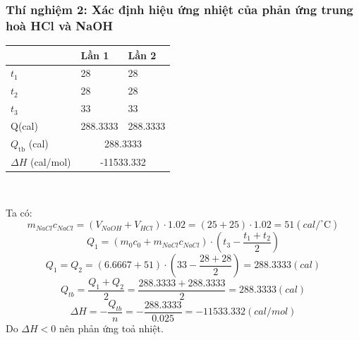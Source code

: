 \documentclass[12pt]{article}
\begin{document}
\subsubsection{Thí nghiệm 2: Xác định hiệu ứng nhiệt của phản ứng trung hoà HCl và NaOH}
{\centering \begin{tabular}{|m{3cm}|m{3cm}|m{3cm}|}
\hline
  & Lần 1 & Lần 2 \\ \hline
$t_1$ & 28 & 28 \\ \hline
$t_2$& 28 & 28 \\ \hline
$t_3$ & 33 & 33\\ \hline
Q(cal) &288.3333 & 288.3333\\ \hline
\(Q_{\text{tb}}\) (cal) & \multicolumn{2}{c|}{288.3333} \\ \hline
$\Delta H$ (cal/mol) & \multicolumn{2}{c|}{-11533.332} \\ \hline
\end{tabular}\\  } 
Ta có:\\
\[
m_{NaCl}c_{NaCl} = (V_{NaOH} + V_{HCl})\cdot1.02 = (25 + 25) \cdot 1.02 = 51 (cal/^\circ\mathrm{C})
\]
\[
Q_1 = (m_0c_0 + m_{NaCl}c_{NaCl})\cdot(t_3 - \frac{t_1 +t_2}{2})
\]
\[
Q_1 = Q_2 = (6.6667+ 51) \cdot (33 - \frac{28 + 28}{2}) = 288.3333 (cal)
\]
\[
Q_{tb} = \frac{Q_1 + Q_2}{2} = \frac{288.3333 + 288.3333}{2} = 288.3333 (cal)
\]
\[
\Delta H = - \frac{Q_{tb}}{n} = - \frac{288.3333}{0.025} = -11533.332 (cal/mol)
\] 
Do $\Delta H < 0$ nên phản ứng toả nhiệt.
\newpage
\end{document}
